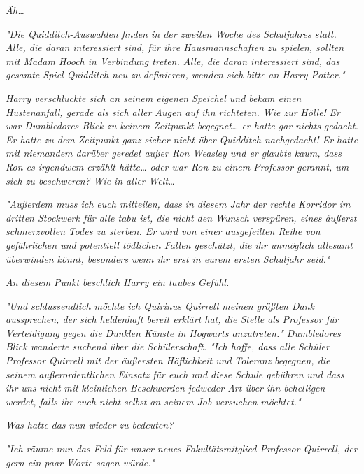 {\emph{Äh…}

\emph{"Die Quidditch-Auswahlen finden in der zweiten Woche des Schuljahres statt. Alle, die daran interessiert sind, für ihre Hausmannschaften zu spielen, sollten mit Madam Hooch in Verbindung treten. Alle, die daran interessiert sind, das gesamte Spiel Quidditch neu zu} \emph{definieren, wenden sich} \emph{bitte} \emph{an Harry Potter."}

\emph{Harry verschluckte sich an seinem eigenen Speichel und bekam einen Hustenanfall, gerade als sich aller Augen auf ihn richteten. Wie zur} \emph{\emph{Hölle!}} \emph{Er war Dumbledores Blick zu keinem Zeitpunkt begegnet… er hatte gar} \emph{nichts} \emph{\emph{gedacht.}} \emph{Er hatte zu dem Zeitpunkt ganz sicher nicht über Quidditch nachgedacht! Er hatte mit niemandem darüber geredet außer Ron Weasley und er glaubte} \emph{\emph{kaum,}} \emph{dass Ron es irgendwem erzählt hätte… oder war Ron zu einem Professor gerannt, um sich zu beschweren?} \emph{\emph{Wie}} \emph{in aller} \emph{\emph{Welt…}}

\emph{"Außerdem muss ich euch mitteilen, dass in diesem Jahr der rechte Korridor im dritten Stockwerk für alle tabu ist, die nicht den Wunsch verspüren, eines äußerst schmerzvollen} \emph{Todes zu sterben. Er wird von einer ausgefeilten Reihe von gefährlichen und potentiell tödlichen Fallen geschützt, die ihr unmöglich allesamt} \emph{überwinden könnt, besonders wenn ihr erst in eurem ersten Schuljahr seid."}

\emph{An diesem Punkt beschlich Harry ein taubes Gefühl.}

\emph{"Und schlussendlich möchte ich Quirinus Quirrell meinen größten Dank aussprechen, der sich heldenhaft bereit erklärt hat, die Stelle als Professor für Verteidigung gegen die Dunklen Künste in Hogwarts anzutreten." Dumbledores} \emph{Blick wanderte suchend über die Schülerschaft. "Ich hoffe, dass alle Schüler Professor Quirrell mit der äußersten Höflichkeit und} \emph{\emph{Toleranz}} \emph{begegnen, die seinem außerordentlichen Einsatz für euch und diese Schule gebühren} \emph{und dass ihr uns} \emph{\emph{nicht}} \emph{mit} \emph{\emph{kleinlichen Beschwerden}} \emph{jedweder Art über ihn behelligen werdet, falls ihr euch nicht} \emph{\emph{selbst}} \emph{an seinem Job versuchen möchtet."}

\emph{Was hatte} \emph{\emph{das}} \emph{nun wieder zu bedeuten?}

\emph{"Ich räume nun das Feld} \emph{für unser neues Fakultätsmitglied Professor Quirrell, der gern ein paar Worte sagen würde."}

}
